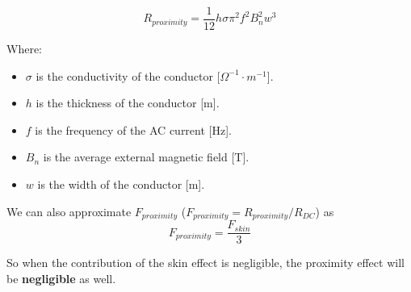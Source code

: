 \begin{itemize}
\begin{samepage}
        \begin{equation}
            R_{proximity} = \frac{1}{12} h \sigma \pi^2 f^2 B_n^2 w^3
        \end{equation}
        \nopagebreak
        
        Where:
        \begin{itemize}
            \item \( \sigma \) is the conductivity of the conductor [\(\Omega^{-1} \cdot m^{-1}\)].
            \item \( h \) is the thickness of the conductor [m].
            \item \( f \) is the frequency of the AC current [Hz].
            \item \( B_n \) is the average external magnetic field [T].
            \item \( w \) is the width of the conductor [m].
        \end{itemize}
    \end{samepage}

    We can also approximate $F_{proximity}$ ($F_{proximity} = R_{proximity}/R_{DC}$) as
    \begin{equation}
        F_{proximity} = \frac{F_{skin}}{3}
    \end{equation}

    So when the contribution of the skin effect is negligible, the proximity effect will be \textbf{negligible} as well.

\end{itemize}






